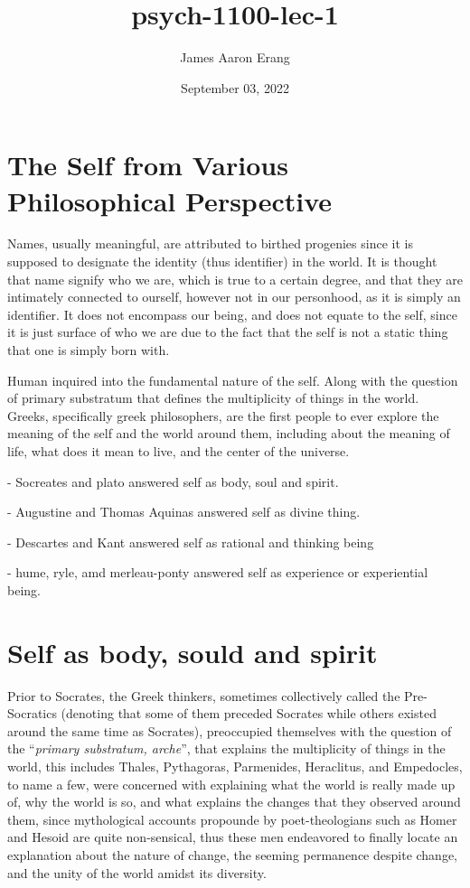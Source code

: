 \documentclass[12pt, UTF8]{article}
\title{psych-1100-lec-1}
\author{James Aaron Erang}
\date{September 03, 2022}
\begin{document}
	\maketitle
	
	\section*{The Self from Various Philosophical Perspective}
	
	Names, usually meaningful, are attributed to birthed progenies since it is supposed to designate the identity (thus identifier) in the world. It is thought that name signify who we are, which is true to a certain degree, and that they are intimately connected to ourself, however not in our personhood, as it is simply an identifier. It does not encompass our being, and does not equate to the self, since it is just surface of who we are due to the fact that the self is not a static thing that one is simply born with.
	
	Human inquired into the fundamental nature of the self. Along with the question of primary substratum that defines the multiplicity of things in the world. Greeks, specifically greek philosophers, are the first people to ever explore the meaning of the self and the world around them, including about the meaning of life, what does it mean to live, and the center of the universe.
	
	- Socreates and plato answered self as body, soul and spirit.
	
	- Augustine and Thomas Aquinas answered self as divine thing.
	
	- Descartes and Kant answered self as rational and thinking being
	
	- hume, ryle, amd merleau-ponty answered self as experience or experiential being.
	
	\section{Self as body, sould and spirit}
	
	Prior to Socrates, the Greek thinkers, sometimes collectively called the Pre-Socratics (denoting that some of them preceded Socrates while others existed around the same time as Socrates), preoccupied themselves with the question of the ``\textit{primary substratum, arche}'', that explains the multiplicity of things in the world, this includes Thales, Pythagoras, Parmenides, Heraclitus, and Empedocles, to name a few, were concerned with explaining what the world is really made up of, why the world is so, and what explains the changes that they observed around them, since mythological accounts propounde by poet-theologians such as Homer and Hesoid are quite non-sensical, thus these men endeavored to finally locate an explanation about the nature of change, the seeming permanence despite change, and the unity of the world amidst its diversity.
	
\end{document}
